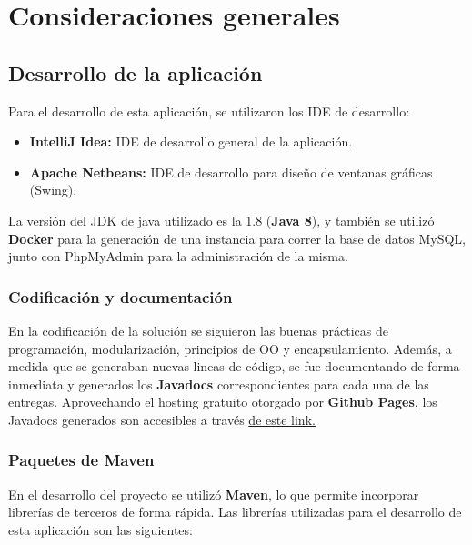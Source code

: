 \renewcommand\thesection{\arabic{section}}
\renewcommand\thesubsection{\thesection.\arabic{subsection}}
\setcounter{section}{7}
\setcounter{subsection}{0}
\section{Consideraciones generales}

\subsection{Desarrollo de la aplicación}
\label{subsec:desarrolloapp}

Para el desarrollo de esta aplicación, se utilizaron los IDE de desarrollo:
\begin{itemize}
    \item \textbf{IntelliJ Idea:} IDE de desarrollo general de la aplicación.
    \item \textbf{Apache Netbeans:} IDE de desarrollo para diseño de ventanas gráficas (Swing).
\end{itemize}

La versión del JDK de java utilizado es la 1.8 (\faJava \textbf{Java 8}), y también se utilizó \faDocker \textbf{Docker} para la generación de una instancia para correr la base de datos \faDatabase MySQL, junto con PhpMyAdmin para la administración de la misma.

\subsubsection{Codificación y documentación}
\label{subsubsec:codydoc}
En la codificación de la solución se siguieron las buenas prácticas de programación, modularización, principios de OO y encapsulamiento. Además, a medida que se generaban nuevas lineas de código, se fue documentando de forma inmediata y generados los \textbf{Javadocs} correspondientes para cada una de las entregas. Aprovechando el hosting gratuito otorgado por \faGithub \textbf{Github Pages}, los Javadocs generados son accesibles a través {\color{MyGreen}\href{https://sebaignacioo.github.io/proyecto-poo/}{de este link.}}

\subsubsection{Paquetes de Maven}
\label{subsubsec:paqmaven}
En el desarrollo del proyecto se utilizó \textbf{Maven}, lo que permite incorporar librerías de terceros de forma rápida. Las librerías utilizadas para el desarrollo de esta aplicación son las siguientes:

